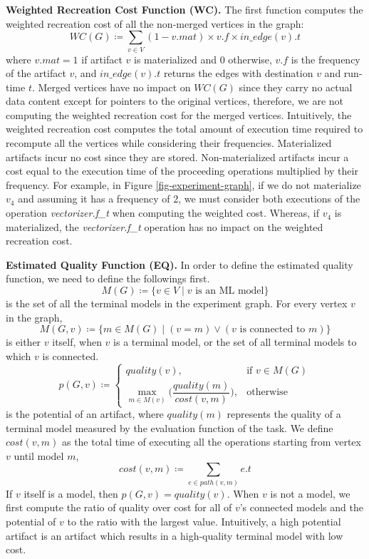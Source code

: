 \textbf{Weighted Recreation Cost Function (WC).} 
The first function computes the weighted recreation cost of all the non-merged vertices in the graph:
\[
WC(G) \coloneqq   \sum\limits_{v \in V}  (1-v.mat) \times v.f \times in\_edge(v).t
\]
where $v.mat = 1$ if artifact $v$ is materialized and $0$ otherwise, $v.f$ is the frequency of the artifact $v$, and $in\_edge(v).t$ returns the edges with destination $v$ and run-time $t$.
Merged vertices have no impact on $WC(G)$ since they carry no actual data content except for pointers to the original vertices, therefore, we are not computing the weighted recreation cost for the merged vertices.
Intuitively, the weighted recreation cost computes the total amount of execution time required to recompute all the vertices while considering their frequencies.
Materialized artifacts incur no cost since they are stored.
Non-materialized artifacts incur a cost equal to the execution time of the proceeding operations multiplied by their frequency.
For example, in Figure \ref{fig-experiment-graph}, if we do not materialize $v_4$ and assuming it has a frequency of 2, we must consider both executions of the operation \textit{vectorizer.f\_t}  when computing the weighted cost.
Whereas, if $v_4$ is materialized, the \textit{vectorizer.f\_t} operation has no impact on the weighted recreation cost.

\textbf{Estimated Quality Function (EQ).} 
In order to define the estimated quality function, we need to define the followings first.
\[
M(G) \coloneqq  \{v \in V \mid v \text{ is an ML model}\}
\]
is the set of all the terminal models in the experiment graph.
For every vertex $v$ in the graph, 
\[
M(G, v) \coloneqq  \{m \in M(G) \mid (v = m) \vee (v \text{ is connected to } m)\}
\]
is either $v$ itself, when $v$ is a terminal model, or the set of all terminal models to which $v$ is connected.
\[
p(G, v) \coloneqq  
		\begin{cases}
		quality(v) , & \text{if } v \in M(G)  \\
		\max\limits_{m \in M(v)} \Big( \dfrac{quality(m)}{cost(v,m)} \Big) , & \text{otherwise}
		\end{cases}
\]
is the potential of an artifact, where $quality(m)$ represents the quality of a terminal model measured by the evaluation function of the task.
We define $cost(v,m)$ as the total time of executing all the operations starting from vertex $v$ until model $m$,
\[
cost(v,m) \coloneqq \sum\limits_{e \in path(v, m)} e.t
\]
If $v$ itself is a model, then $p(G, v) = quality(v)$.
When $v$ is not a model, we first compute the ratio of quality over cost for all of $v$'s connected models and the potential of $v$ to the ratio with the largest value.
Intuitively, a high potential artifact is an artifact which results in a high-quality terminal model with low cost.

